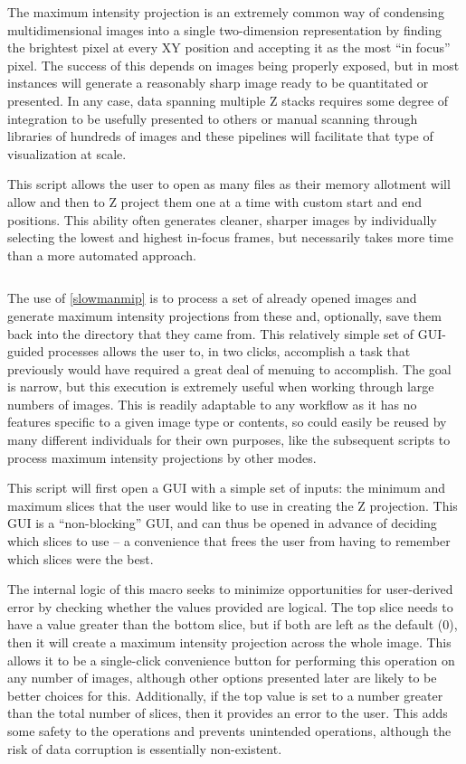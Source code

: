 The maximum intensity projection is an extremely common way of condensing multidimensional images into a single two-dimension representation by finding the brightest pixel at every XY position and accepting it as the most ``in focus'' pixel. The success of this depends on images being properly exposed, but in most instances will generate a reasonably sharp image ready to be quantitated or presented. In any case, data spanning multiple Z stacks requires some degree of integration to be usefully presented to others or manual scanning through libraries of hundreds of images and these pipelines will facilitate that type of visualization at scale.

\begin{code}
\caption{This script allows the user to open as many files as their memory allotment will allow and then to Z project them one at a time with custom start and end positions. This ability often generates cleaner, sharper images by individually selecting the lowest and highest in-focus frames, but necessarily takes more time than a more automated approach.}
\label{slowmanmip}

\inputminted[breaklines,frame=single,fontsize=\small]{python}{source/manMIPper.py}

\end{code}

The use of \autoref{slowmanmip} is to process a set of already opened images and generate maximum intensity projections from these and, optionally, save them back into the directory that they came from. This relatively simple set of GUI-guided processes allows the user to, in two clicks, accomplish a task that previously would have required a great deal of menuing to accomplish. The goal is narrow, but this execution is extremely useful when working through large numbers of images. This is readily adaptable to any workflow as it has no features specific to a given image type or contents, so could easily be reused by many different individuals for their own purposes, like the subsequent scripts to process maximum intensity projections by other modes.

This script will first open a GUI with a simple set of inputs: the minimum and maximum slices that the user would like to use in creating the Z projection. This GUI is a ``non-blocking'' GUI, and can thus be opened in advance of deciding which slices to use -- a convenience that frees the user from having to remember which slices were the best. 

The internal logic of this macro seeks to minimize opportunities for user-derived error by checking whether the values provided are logical. The top slice needs to have a value greater than the bottom slice, but if both are left as the default (0), then it will create a maximum intensity projection across the whole image. This allows it to be a single-click convenience button for performing this operation on any number of images, although other options presented later are likely to be better choices for this. Additionally, if the top value is set to a number greater than the total number of slices, then it provides an error to the user. This adds some safety to the operations and prevents unintended operations, although the risk of data corruption is essentially non-existent. 

